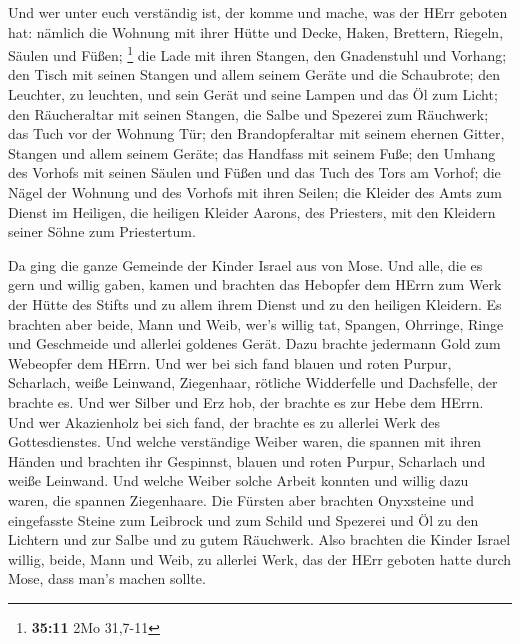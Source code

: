  Und wer unter euch verständig ist, der komme und mache,
was der HErr geboten hat:  nämlich die Wohnung mit ihrer
Hütte und Decke, Haken, Brettern, Riegeln, Säulen und Füßen; \footnote{\textbf{35:11}
  2Mo 31,7-11}  die Lade mit ihren Stangen, den Gnadenstuhl
und Vorhang;  den Tisch mit seinen Stangen und allem seinem
Geräte und die Schaubrote;  den Leuchter, zu leuchten, und
sein Gerät und seine Lampen und das Öl zum Licht;  den
Räucheraltar mit seinen Stangen, die Salbe und Spezerei zum Räuchwerk;
das Tuch vor der Wohnung Tür;  den Brandopferaltar mit
seinem ehernen Gitter, Stangen und allem seinem Geräte; das Handfass mit
seinem Fuße;  den Umhang des Vorhofs mit seinen Säulen und
Füßen und das Tuch des Tors am Vorhof;  die Nägel der
Wohnung und des Vorhofs mit ihren Seilen;  die Kleider des
Amts zum Dienst im Heiligen, die heiligen Kleider Aarons, des Priesters,
mit den Kleidern seiner Söhne zum Priestertum.

 Da ging die ganze Gemeinde der Kinder Israel aus von Mose.
 Und alle, die es gern und willig gaben, kamen und brachten
das Hebopfer dem HErrn zum Werk der Hütte des Stifts und zu allem ihrem
Dienst und zu den heiligen Kleidern.  Es brachten aber
beide, Mann und Weib, wer's willig tat, Spangen, Ohrringe, Ringe und
Geschmeide und allerlei goldenes Gerät. Dazu brachte jedermann Gold zum
Webeopfer dem HErrn.  Und wer bei sich fand blauen und
roten Purpur, Scharlach, weiße Leinwand, Ziegenhaar, rötliche
Widderfelle und Dachsfelle, der brachte es.  Und wer Silber
und Erz hob, der brachte es zur Hebe dem HErrn. Und wer Akazienholz bei
sich fand, der brachte es zu allerlei Werk des Gottesdienstes.
 Und welche verständige Weiber waren, die spannen mit ihren
Händen und brachten ihr Gespinnst, blauen und roten Purpur, Scharlach
und weiße Leinwand.  Und welche Weiber solche Arbeit
konnten und willig dazu waren, die spannen Ziegenhaare. 
Die Fürsten aber brachten Onyxsteine und eingefasste Steine zum Leibrock
und zum Schild  und Spezerei und Öl zu den Lichtern und zur
Salbe und zu gutem Räuchwerk.  Also brachten die Kinder
Israel willig, beide, Mann und Weib, zu allerlei Werk, das der HErr
geboten hatte durch Mose, dass man's machen sollte.

